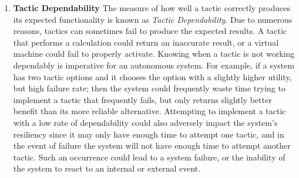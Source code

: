 \documentclass[11pt]{proposalnsf}
\newcommand{\dan}[1]{\textcolor{blue}{{\it [Dan says: #1]}}}
\newcommand{\amit}[1]{\textcolor{red}{{\it [Amit: #1]}}}
\newlength\q %
\begin{document}
\begin{sloppypar}
\begin{enumerate}[noitemsep]
	\item \textbf{Tactic Dependability} The measure of how well a tactic correctly produces its expected functionality is known as \emph{Tactic Dependability}. Due to numerous reasons, tactics can sometimes fail to produce the expected results. A tactic that performs a calculation could return an inaccurate result, or a virtual machine could fail to properly activate. Knowing when a tactic is not working dependably is imperative for an autonomous system. For example, if a system has two tactic options and it chooses the option with a slightly higher utility, but high failure rate; then the system could frequently waste time trying to implement a tactic that frequently fails, but only returns slightly better benefit than its more reliable alternative. Attempting to implement a tactic with a low rate of dependability could also adversely impact the system's resiliency since it may only have enough time to attempt one tactic, and in the event of failure the system will not have enough time to attempt another tactic. Such an occurrence could lead to a system failure, or the inability of the system to react to an internal or external event. 
 


\end{enumerate}
\end{sloppypar}
\end{document}
